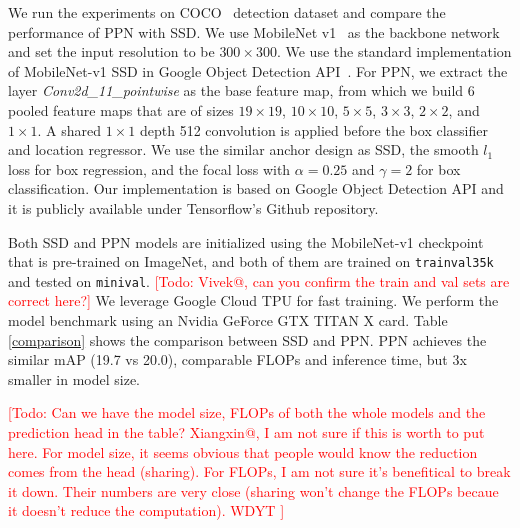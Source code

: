 \documentclass[10pt,twocolumn,letterpaper]{article}
\newcommand{\todo}[1]{\textcolor{red}{[Todo: #1]}}
\begin{document}
We run the experiments on COCO~\cite{lin2014coco} detection dataset
and compare the performance of PPN with SSD.
We use MobileNet v1~\cite{howard2017mobilenet} as the backbone network
and set the input resolution to be $300\times 300$.
We use the standard implementation of MobileNet-v1 SSD in Google Object Detection API~\cite{huang2017gmi}.
For PPN,
we extract the layer \textit{Conv2d\_11\_pointwise} as the base feature map,
from which we build 6 pooled feature maps that are of sizes
$19\times 19$,
$10\times 10$,
$5\times 5$,
$3\times 3$,
$2\times 2$, and
$1\times 1$.
A shared $1\times 1$ depth 512 convolution is applied before the box classifier and location regressor.
We use the similar anchor design as SSD,
the smooth $l_{1}$ loss for box regression,
and the focal loss with $\alpha=0.25$ and $\gamma=2$ for box classification.
Our implementation is based on Google Object Detection API
and it is publicly available under Tensorflow's Github repository.

Both SSD and PPN models are initialized using the MobileNet-v1 checkpoint
that is pre-trained on ImageNet, and
both of them are trained on \texttt{trainval35k} and tested on \texttt{minival}.
\todo{Vivek@, can you confirm the train and val sets are correct here?}
We leverage Google Cloud TPU for fast training.
We perform the model benchmark using an Nvidia GeForce GTX TITAN X card.
Table \ref{comparison} shows the comparison between SSD and PPN.
PPN achieves the similar mAP (19.7 vs 20.0),
comparable FLOPs and inference time,
but 3x smaller in model size.

\todo{Can we have the model size, FLOPs of both the whole
models and the prediction head in the table?
Xiangxin@, I am not sure if this is worth to put here.
For model size, it seems obvious that people would know the reduction comes from the head (sharing).
For FLOPs, I am not sure it's benefitical to break it down.
Their numbers are very close (sharing won't change the FLOPs becaue it doesn't reduce the computation).
WDYT
}


{\small


}
\end{document}
